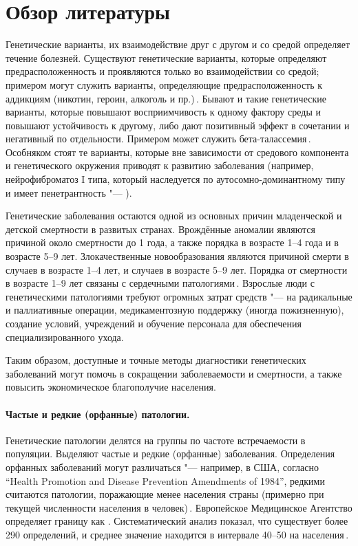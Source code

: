 \documentclass[a4paper,14pt]{extarticle}
\newcommand{\thousands}{тыс.}
\newcommand{\mln}{млн}
\newcommand{\ecitep}[1]{\textenglish{\citep{#1}}}
\begin{document}
\section{Обзор литературы}

Генетические варианты, их взаимодействие друг с другом и со средой определяет течение болезней.
Существуют генетические варианты, которые определяют предрасположенность и проявляются только во взаимодействии со средой; примером могут служить варианты, определяющие предрасположенность к аддикциям (никотин, героин, алкоголь и пр.)\,\ecitep{Hiroi_2004}.
Бывают и такие генетические варианты, которые повышают восприимчивость к одному фактору среды и повышают устойчивость к другому, либо дают позитивный эффект в сочетании и негативный по отдельности.
Примером может служить бета-талассемия\,\ecitep{Galanello_2010}.
Особняком стоят те варианты, которые вне зависимости от средового компонента и генетического окружения приводят к развитию заболевания (например, нейрофиброматоз I типа, который наследуется по аутосомно-доминантному типу и имеет  пенетрантность "--- \citealp{Jett_2009}).

Генетические заболевания остаются одной из основных причин младенческой и детской смертности в развитых странах.
Врождённые аномалии являются причиной около  смертности до 1 года, а также порядка  в возрасте 1--4 года и  в возрасте 5--9 лет.
Злокачественные новообразования являются причиной смерти в  случаев в возрасте 1--4 лет, и  случаев в возрасте 5--9 лет.
Порядка  от смертности в возрасте 1--9 лет связаны с сердечными патологиями\,\ecitep{Field_2003}.
Взрослые люди с генетическими патологиями требуют огромных затрат средств "--- на радикальные и паллиативные операции, медикаментозную поддержку (иногда пожизненную), создание условий, учреждений и обучение персонала для обеспечения специализированного ухода.

Таким образом, доступные и точные методы диагностики генетических заболеваний могут помочь в сокращении заболеваемости и смертности, а также повысить экономическое благополучие населения.

\paragraph{Частые и редкие (орфанные) патологии.}
Генетические патологии делятся на группы по частоте встречаемости в популяции.
Выделяют частые и редкие (орфанные) заболевания.
Определения орфанных заболеваний могут различаться "--- например, в США, согласно \textenglish{``Health Promotion and Disease Prevention Amendments of 1984''}, редкими считаются патологии, поражающие менее \numprint[\thousands]{200} населения страны (примерно  при текущей численности населения в \numprint[\mln]{326} человек)\,\ecitep{Herder_2017}.
Европейское Медицинское Агентство определяет границу как .
Систематический анализ показал, что существует более 290 определений, и среднее значение находится в интервале 40--50 на \numprint[\thousands]{100} населения\,\ecitep{Richter_2015}.
\end{document}
